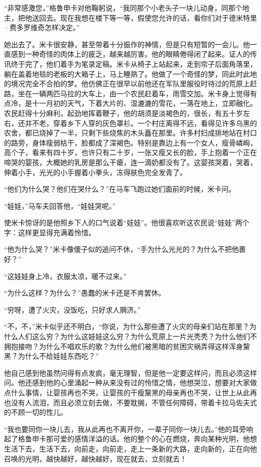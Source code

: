 \par “非常感激您，”格鲁申卡对他鞠躬说，“我同那个小老头子一块儿动身，同那个地主，把他送回去。现在我想在楼下等一等，假使您允许的话，看你们对于德米特里·费多罗维奇怎样决定。”
\par 她出去了。米卡很安静，甚至带着十分振作的神情，但是只有短暂的一会儿。他一直感到一种奇怪的肉体上的疲乏，越来越厉害。他的眼睛倦得闭了起来。证人的传讯终于完了，他们着手为笔录定稿。米卡从椅子上站起来，走到帘子后面角落里，躺在盖着地毯的老板的大箱子上，马上睡熟了。他做了一个奇怪的梦，同此时此地的境况完全不合拍的梦。他仿佛正在很早以前他还在军队里服役时待过的荒原上赶路，坐在一辆两匹马拉的大车上，由一个农民赶着车，雨雪交加。米卡身上觉得有点冷，是十一月初的天气，下着大片的、湿漉漉的雪花，一落在地上，立即融化。农民赶得十分麻利，起劲地挥着鞭子，他的胡须是淡褐色的，很长，有五十岁左右，还并不老，穿着乡下人穿的灰色罩衫。一个村庄离得不远，看得见许多乌黑的农舍，都已烧掉了一半，只剩下些烧焦的木头矗在那里。许多村妇成排地站在村口的路旁，身体瘦弱枯干，脸都成了深褐色。特别是靠边上有一个女人，瘦骨嶙峋，高个子，看来有四十岁，也许只有二十岁，一张又瘦又长的脸，手上抱着一个正在啼哭的婴孩，大概她的乳房是那么干瘪，连一滴奶都没有了。这婴孩哭着，哭着，伸着小手，光光的小手握着小拳头，冻得肤色完全发青了。
\par “他们为什么哭？他们在哭什么？”在马车飞跑过她们面前的时候，米卡问。
\par “娃娃，”马车夫回答他，“娃娃哭呢。”
\par 使米卡惊讶的是他照乡下人的口气说着“娃娃”。他很喜欢听这农民说“娃娃”两个字：这样更显得充满着怜惜。
\par “他为什么哭？”米卡像傻子似的追问不休，“手为什么光光的？为什么不把他裹好？”
\par “这娃娃身上冷，衣服太凉，暖不过来。”
\par “为什么这样？为什么？”愚蠢的米卡还是不肯罢休。
\par “穷呀，遭了火灾，没饭吃，只好求人赒济。”
\par “不，不，”米卡似乎还不明白，“你说，为什么那些遭了火灾的母亲们站在那里？为什么人们这么穷？为什么这娃娃这么穷？为什么荒原上一片光秃秃？为什么他们不拥抱接吻？为什么不唱欢乐的歌？为什么他们被黑暗的贫困灾祸弄得这样浑身黧黑？为什么不给娃娃东西吃？”
\par 他自己感到他虽然问得有点发疯，毫无理智，但是他一定要这样问，而且必须这样问。他还感到他的心里涌起一种从来没有过的怜惜之情，他想哭泣，想要对大家做点什么事情，让婴孩再也不哭，让婴孩的干瘦黧黑的母亲再也不哭，让世上从此再也没有人流泪，而且必须立刻去做，不要耽搁，不管任何障碍，带着卡拉马佐夫式的不顾一切的性儿。
\par “我也要同你一块儿去，我从此再也不离开你，一辈子同你一块儿去。”他的耳旁响起了格鲁申卡那可爱的感情洋溢的话。他的整个的心在燃烧，奔向某种光明，他想生活下去，生活下去，向前走，向前走，走上一条新的大路，走向新的，正在向他召唤的光明，越快越好，越快越好，现在就去，立刻就去！
